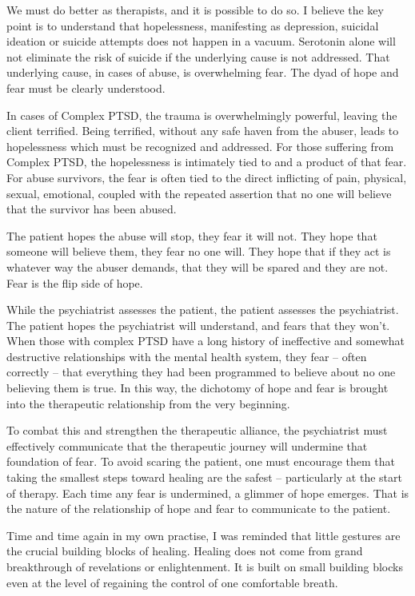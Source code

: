 \documentclass[]{book}
\begin{document}
We must do better as therapists, and it is possible to do so. I believe the key point is to understand that hopelessness, manifesting as depression, suicidal ideation or suicide attempts does not happen in a vacuum. Serotonin alone will not eliminate the risk of suicide if the underlying cause is not addressed. That underlying cause, in cases of abuse, is overwhelming fear. The dyad of hope and fear must be clearly understood.

In cases of Complex PTSD, the trauma is overwhelmingly powerful, leaving the client terrified. Being terrified, without any safe haven from the abuser, leads to hopelessness which must be recognized and addressed. For those suffering from Complex PTSD, the hopelessness is intimately tied to and a product of that fear. For abuse survivors, the fear is often tied to the direct inflicting of pain, physical, sexual, emotional, coupled with the repeated assertion that no one will believe that the survivor has been abused.

The patient hopes the abuse will stop, they fear it will not. They hope that someone will believe them, they fear no one will. They hope that if they act is whatever way the abuser demands, that they will be spared and they are not. Fear is the flip side of hope.

While the psychiatrist assesses the patient, the patient assesses the psychiatrist. The patient hopes the psychiatrist will understand, and fears that they won't. When those with complex PTSD have a long history of ineffective and somewhat destructive relationships with the mental health system, they fear -- often correctly -- that everything they had been programmed to believe about no one believing them is true. In this way, the dichotomy of hope and fear is brought into the therapeutic relationship from the very beginning.

To combat this and strengthen the therapeutic alliance, the psychiatrist must effectively communicate that the therapeutic journey will undermine that foundation of fear. To avoid scaring the patient, one must encourage them that taking the smallest steps toward healing are the safest -- particularly at the start of therapy. Each time any fear is undermined, a glimmer of hope emerges. That is the nature of the relationship of hope and fear to communicate to the patient.

Time and time again in my own practise, I was reminded that little gestures are the crucial building blocks of healing. Healing does not come from grand breakthrough of revelations or enlightenment. It is built on small building blocks even at the level of regaining the control of one comfortable breath.
\end{document}
